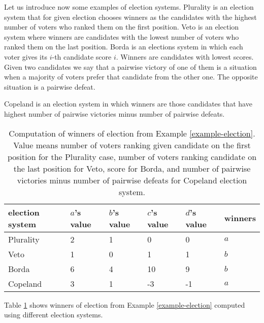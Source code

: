 Let us introduce now some examples of election systems.
Plurality is an election system that for given election chooses winners as the candidates
with the highest number of voters who ranked them on the first position.
Veto is an election system where winners are candidates with
the lowest number of voters who ranked them on the last position.
Borda is an elections system in which each voter gives its $i$-th candidate score $i$.
Winners are candidates with lowest scores.
Given two candidates we say that a pairwise victory of one of them
is a situation when a majority of voters prefer that candidate from the other one.
The opposite situation is a pairwise defeat.

Copeland is an election system in which winners are those candidates that have
highest number of pairwise victories minus number of pairwise defeats.

\begin{table}[h] \centering
\begin{tabular}{| l | l | l | l | l | l |} \hline
    election system	& $a$'s value	& $b$'s value	& $c$'s value	& $d$'s value	& winners \\ \hline
	Plurality 		& 2				& 1				& 0				& 0				& $a$ \\ \hline
	Veto			& 1				& 0				& 1				& 1				& $b$ \\ \hline
	Borda	 		& 6				& 4				& 10			& 9				& $b$ \\ \hline
	Copeland		& 3				& 1				& -3			& -1			& $a$ \\ \hline
\end{tabular}
\caption{Computation of winners of election from Example \ref{example-election}.
Value means number of voters ranking given candidate on the first position for the Plurality case,
number of voters ranking candidate on the last position for Veto,
score for Borda,
and number of pairwise victories minus number of pairwise defeats for Copeland election system.} \label{example-winners}
\end{table}

Table \ref{example-winners} shows winners of election from Example \ref{example-election}
computed using different election systems.

